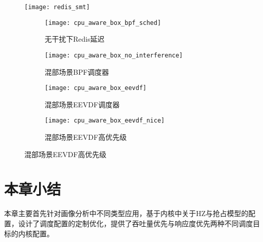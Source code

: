 \begin{figure}[!htbp]
    \centering
    \texttt{[image: redis\_smt]}
    \label{fig:redis_smt}
\end{figure}

\begin{figure}[H]
    \centering
    \begin{subfigure}[b]{0.4\textwidth}
        \texttt{[image: cpu\_aware\_box\_bpf\_sched]}
        \caption{无干扰下Redis延迟}
        \label{fig:cpu_aware_box_bpf_sched}
    \end{subfigure}
    \begin{subfigure}[b]{0.4\textwidth}
        \texttt{[image: cpu\_aware\_box\_no\_interference]}
        \caption{混部场景BPF调度器}
        \label{fig:cpu_aware_box_no_interference}
    \end{subfigure}
    \begin{subfigure}[b]{0.4\textwidth}
        \texttt{[image: cpu\_aware\_box\_eevdf]}
        \caption{混部场景EEVDF调度器}
        \label{fig:cpu_aware_box_eevdf}
    \end{subfigure}
    \begin{subfigure}[b]{0.4\textwidth}
        \texttt{[image: cpu\_aware\_box\_eevdf\_nice]}
        \caption{混部场景EEVDF高优先级}
        \label{fig:cpu_aware_box_eevdf_nice}
    \end{subfigure}
\label{fig:lc_box}
\end{figure}




\section{本章小结}

本章主要首先针对画像分析中不同类型应用，基于内核中关于HZ与抢占模型的配置，设计了调度配置的定制优化，提供了吞吐量优先与响应度优先两种不同调度目标的内核配置。

